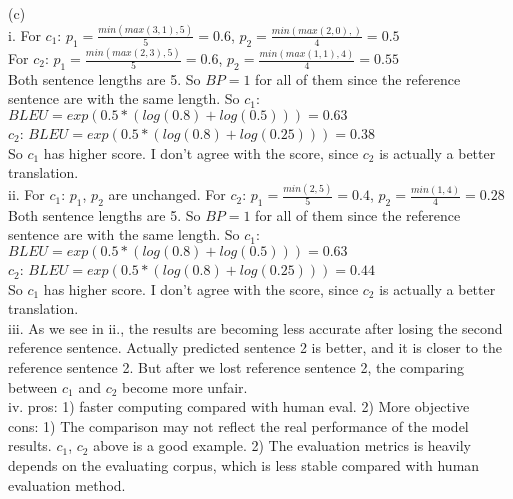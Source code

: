 \documentclass[11pt]{article}
\begin{document}
(c) \\
i. For $c_1$: $p_1=\frac{min(max(3, 1), 5)}{5} = 0.6$, $p_2 = \frac{min(max(2, 0), )}{4}=0.5$\\
For $c_2$: $p_1=\frac{min(max(2, 3), 5)}{5} = 0.6$, $p_2 = \frac{min(max(1, 1), 4)}{4}=0.55$\\
Both sentence lengths are 5. So $BP=1$ for all of them since the reference sentence are with the same length. So $c_1$: $BLEU = exp(0.5 * (log(0.8)+log(0.5)))= 0.63$\\
$c_2$: $BLEU = exp(0.5 * (log(0.8)+log(0.25)))= 0.38$\\
So $c_1$ has higher score. I don't agree with the score, since $c_2$ is actually a better translation.\\
ii. For $c_1$: $p_1$, $p_2$ are unchanged. 
For $c_2$: $p_1=\frac{min(2, 5)}{5} = 0.4$, $p_2 = \frac{min(1, 4)}{4}=0.28$\\
Both sentence lengths are 5. So $BP=1$ for all of them since the reference sentence are with the same length. So $c_1$: $BLEU = exp(0.5 * (log(0.8)+log(0.5)))= 0.63$\\
$c_2$: $BLEU = exp(0.5 * (log(0.8)+log(0.25)))= 0.44$\\
So $c_1$ has higher score. I don't agree with the score, since $c_2$ is actually a better translation.\\
iii. As we see in ii., the results are becoming less accurate after losing the second reference sentence. Actually predicted sentence 2 is better, and it is closer to the reference sentence 2. But after we lost reference sentence 2, the comparing between $c_1$ and $c_2$ become more unfair.\\
iv. pros: 1) faster computing compared with human eval. 2) More objective \\
cons: 1) The comparison may not reflect the real performance of the model results. $c_1$, $c_2$ above is a good example. 2) The evaluation metrics is heavily depends on the evaluating corpus, which is less stable compared with human evaluation method.
\end{document}
